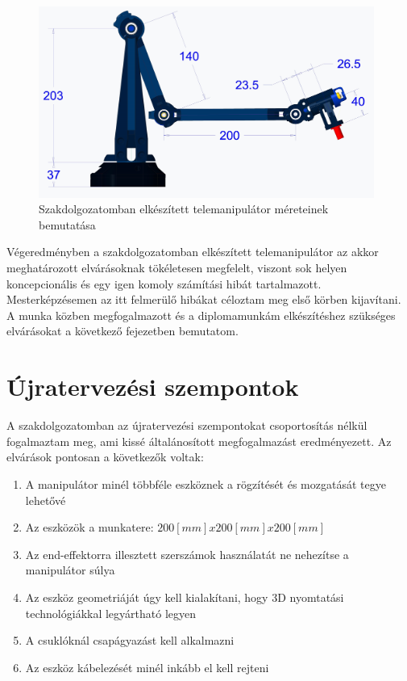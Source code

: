 \begin{figure}[!ht]
\centering
\includegraphics[width=110mm, keepaspectratio]{figures/Szakdoga/00_v_4_kar}
\caption{Szakdolgozatomban elkészített telemanipulátor méreteinek bemutatása}
\label{fig:Szakdoga_csipeszes}
\end{figure}

Végeredményben a szakdolgozatomban elkészített telemanipulátor az akkor meghatározott elvárásoknak tökéletesen megfelelt, viszont sok helyen koncepcionális és egy igen komoly számítási hibát tartalmazott. Mesterképzésemen az itt felmerülő hibákat céloztam meg első körben kijavítani. A munka közben megfogalmazott és a diplomamunkám elkészítéshez szükséges elvárásokat a következő fejezetben bemutatom.

\section{Újratervezési szempontok}
\label{sec:ujratervezesi_szempontok}

A szakdolgozatomban az újratervezési szempontokat csoportosítás nélkül fogalmaztam meg, ami kissé általánosított megfogalmazást eredményezett. Az elvárások pontosan a következők voltak:

\begin{enumerate}
\item A manipulátor minél többféle eszköznek a rögzítését és mozgatását tegye lehetővé
\item Az eszközök a munkatere: $200[mm]x200[mm]x200[mm]$
\item Az end-effektorra illesztett szerszámok használatát ne nehezítse a manipulátor súlya
\item Az eszköz geometriáját úgy kell kialakítani, hogy 3D nyomtatási technológiákkal legyártható legyen
\item A csuklóknál csapágyazást kell alkalmazni
\item Az eszköz kábelezését minél inkább el kell rejteni
\end{enumerate}

